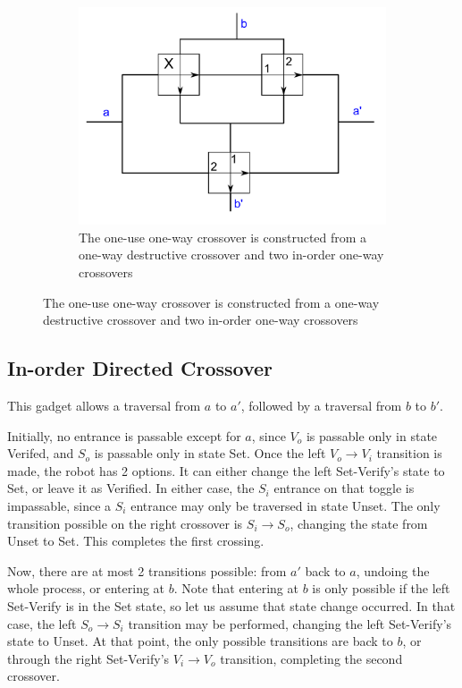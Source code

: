 \documentclass[11pt]{article}
\begin{document}
\begin{figure}[!ht]
  \centering
  \caption{Two types of crossover gadgets}
  \begin{subfigure}[b]{0.9\textwidth}
    \includegraphics[width=\textwidth]{np_crossover}
    \caption{The one-use one-way crossover is constructed from a one-way destructive crossover and two in-order one-way crossovers}
    \label{OneUseCrossover}
  \end{subfigure}
\end{figure}

\subsection{In-order Directed Crossover}
This gadget allows a traversal from $a$ to $a'$, followed by a traversal from $b$ to $b'$.

Initially, no entrance is passable except for $a$, since $V_o$ is passable only in state Verifed, and $S_o$ is
passable only in state Set. Once the left $V_o \rightarrow V_i$ transition is made, the robot has 2 options.
It can either change the left Set-Verify's state to Set, or leave it as Verified. In either case, the $S_i$
entrance on that toggle is impassable, since a $S_i$ entrance may only be traversed in state Unset. The
only transition possible on the right crossover is $S_i \rightarrow S_o$, changing the state from Unset to Set.
This completes the first crossing.

Now, there are at most 2 transitions possible: from $a'$ back to $a$, undoing the whole process, or entering at $b$. Note that entering at $b$ is only possible if the left Set-Verify is in the Set state, so let us assume that state change occurred. In that case, the left $S_o \rightarrow S_i$ transition may be performed, changing the left Set-Verify's state to Unset. At that point, the only possible transitions are back to $b$, or through the right Set-Verify's
$V_i \rightarrow V_o$ transition, completing the second crossover.
\end{document}
